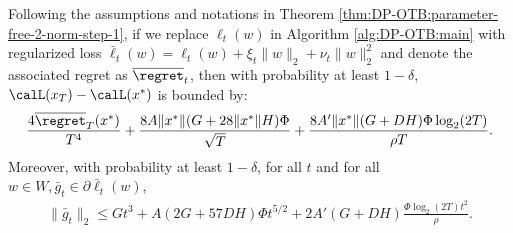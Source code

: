 \begin{theorem}
\label{thm:DP-OTB:parameter-free-main}
Following the assumptions and notations in Theorem \ref{thm:DP-OTB:parameter-free-2-norm-step-1}, if we replace $\ell_t(w)$ in Algorithm \ref{alg:DP-OTB:main} with regularized loss $\bar \ell_t(w) = \ell_t(w) + \xi_t\|w\|_2 + \nu_t\|w\|_2^2$ and denote the associated regret as $\overline \regret_t$, then with probability at least $1-\delta$, $\calL(x_T)-\calL(x^*)$ is bounded by:
\begin{align*}
    \frac{4\overline \regret_T(x^*)}{T^4} + \frac{8A\|x^*\|(G+28\|x^*\|H)\Phi}{\sqrt{T}} + \frac{8A'\|x^*\|(G+DH)\Phi\log_2(2T)}{\rho T}.
\end{align*}
Moreover, with probability at least $1-\delta$, for all $t$ and for all $w\in W, \bar g_t \in \partial \bar \ell_t(w)$,
\begin{align*}
    \|\bar g_t\|_2 \leq Gt^3 + A(2G+57DH)\Phi t^{5/2} + 2A'(G+DH)\frac{\Phi\log_2(2T)t^2}{\rho}.
\end{align*}
\end{theorem}